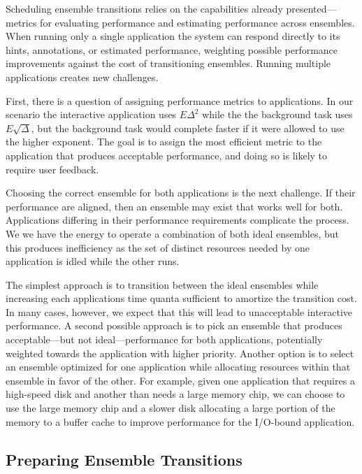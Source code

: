 Scheduling ensemble transitions relies on the capabilities already
presented---metrics for evaluating performance and estimating performance
across ensembles. When running only a single application the system can
respond directly to its hints, annotations, or estimated performance,
weighting possible performance improvements against the cost of transitioning
ensembles. Running multiple applications creates new challenges.

First, there is a question of assigning performance metrics to applications.
In our scenario the interactive application uses $E\Delta^2$ while the the
background task uses $E\sqrt{\Delta}$, but the background task would complete
faster if it were allowed to use the higher exponent. The goal is to assign
the most efficient metric to the application that produces acceptable
performance, and doing so is likely to require user feedback.

Choosing the correct ensemble for both applications is the next challenge. If
their performance are aligned, then an ensemble may exist that works well for
both. Applications differing in their performance requirements complicate the
process. We we have the energy to operate a combination of both ideal
ensembles, but this produces inefficiency as the set of distinct resources
needed by one application is idled while the other runs.

The simplest approach is to transition between the ideal ensembles while
increasing each applications time quanta sufficient to amortize the
transition cost. In many cases, however, we expect that this will lead to
unacceptable interactive performance. A second possible approach is to pick
an ensemble that produces acceptable---but not ideal---performance for
both applications, potentially weighted towards the application with higher
priority. Another option is to select an ensemble optimized for one
application while allocating resources within that ensemble in favor of the
other. For example, given one application that requires a high-speed disk and
another than needs a large memory chip, we can choose to use the large memory
chip and a slower disk allocating a large portion of the memory to a buffer
cache to improve performance for the I/O-bound application.

\subsection{Preparing Ensemble Transitions}
\label{subsec-prepare}

